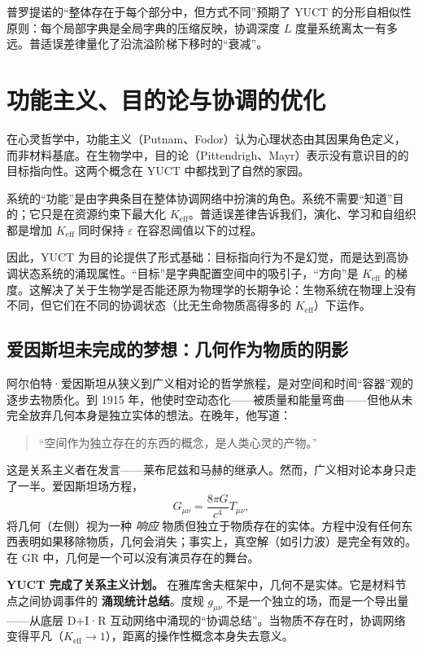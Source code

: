 \documentclass[12pt,a4paper]{article}
\begin{document}
	普罗提诺的“整体存在于每个部分中，但方式不同”预期了 YUCT 的分形自相似性原则：每个局部字典是全局字典的压缩反映，协调深度 \(L\) 度量系统离太一有多远。普适误差律量化了沿流溢阶梯下移时的“衰减”。
	
	\section{功能主义、目的论与协调的优化}
	
	在心灵哲学中，功能主义（Putnam、Fodor）认为心理状态由其因果角色定义，而非材料基底。在生物学中，目的论（Pittendrigh、Mayr）表示没有意识目的的目标指向性。这两个概念在 YUCT 中都找到了自然的家园。
	
	系统的“功能”是由字典条目在整体协调网络中扮演的角色。系统不需要“知道”目的；它只是在资源约束下最大化 \(K_{\mathrm{eff}}\)。普适误差律告诉我们，演化、学习和自组织都是增加 \(K_{\mathrm{eff}}\) 同时保持 \(\varepsilon\) 在容忍阈值以下的过程。
	
	因此，YUCT 为目的论提供了形式基础：目标指向行为不是幻觉，而是达到高协调状态系统的涌现属性。“目标”是字典配置空间中的吸引子，“方向”是 \(K_{\mathrm{eff}}\) 的梯度。这解决了关于生物学是否能还原为物理学的长期争论：生物系统在物理上没有不同，但它们在不同的协调状态（比无生命物质高得多的 \(K_{\mathrm{eff}}\)）下运作。
	
	\subsection{爱因斯坦未完成的梦想：几何作为物质的阴影}
	
	阿尔伯特·爱因斯坦从狭义到广义相对论的哲学旅程，是对空间和时间“容器”观的逐步去物质化。到 1915 年，他使时空动态化——被质量和能量弯曲——但他从未完全放弃几何本身是独立实体的想法。在晚年，他写道：
	
	\begin{quote}
		“空间作为独立存在的东西的概念，是人类心灵的产物。”
	\end{quote}
	
	这是关系主义者在发言——莱布尼兹和马赫的继承人。然而，广义相对论本身只走了一半。爱因斯坦场方程，
	\[
	G_{\mu\nu} = \frac{8\pi G}{c^4} T_{\mu\nu},
	\]
	将几何（左侧）视为一种 \emph{响应} 物质但独立于物质存在的实体。方程中没有任何东西表明如果移除物质，几何会消失；事实上，真空解（如引力波）是完全有效的。在 GR 中，几何是一个可以没有演员存在的舞台。
	
	\textbf{YUCT 完成了关系主义计划。} 在雅库舍夫框架中，几何不是实体。它是材料节点之间协调事件的 \textbf{涌现统计总结}。度规 \(g_{\mu\nu}\) 不是一个独立的场，而是一个导出量——从底层 D+I·R 互动网络中涌现的“协调总结”。当物质不存在时，协调网络变得平凡（\(K_{\mathrm{eff}} \to 1\)），距离的操作性概念本身失去意义。
	
\end{document}
